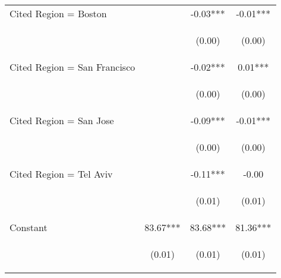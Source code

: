 \begin{center}
\begin{tabular}{lccc}
Cited Region = Boston &  & -0.03*** & -0.01*** \\
\vspace{4pt} & \begin{footnotesize}\end{footnotesize} & \begin{footnotesize}(0.00)\end{footnotesize} & \begin{footnotesize}(0.00)\end{footnotesize} \\
Cited Region = San Francisco &  & -0.02*** & 0.01*** \\
\vspace{4pt} & \begin{footnotesize}\end{footnotesize} & \begin{footnotesize}(0.00)\end{footnotesize} & \begin{footnotesize}(0.00)\end{footnotesize} \\
Cited Region = San Jose &  & -0.09*** & -0.01*** \\
\vspace{4pt} & \begin{footnotesize}\end{footnotesize} & \begin{footnotesize}(0.00)\end{footnotesize} & \begin{footnotesize}(0.00)\end{footnotesize} \\
Cited Region = Tel Aviv &  & -0.11*** & -0.00 \\
\vspace{4pt} & \begin{footnotesize}\end{footnotesize} & \begin{footnotesize}(0.01)\end{footnotesize} & \begin{footnotesize}(0.01)\end{footnotesize} \\
Constant & 83.67*** & 83.68*** & 81.36*** \\
 & \begin{footnotesize}(0.01)\end{footnotesize} & \begin{footnotesize}(0.01)\end{footnotesize} & \begin{footnotesize}(0.01)\end{footnotesize} \\

\end{tabular}
\end{center}
